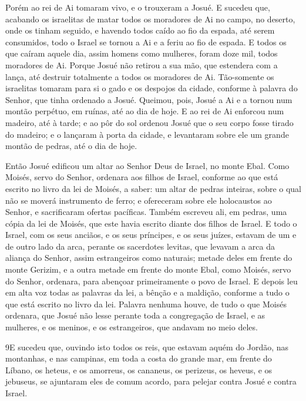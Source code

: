 Porém ao rei de Ai tomaram vivo, e o trouxeram a Josué. E
sucedeu que, acabando os israelitas de matar todos os moradores de
Ai no campo, no deserto, onde os tinham seguido, e havendo todos
caído ao fio da espada, até serem consumidos, todo o Israel se
tornou a Ai e a feriu ao fio de espada. E todos os que caíram
aquele dia, assim homens como mulheres, foram doze mil, todos
moradores de Ai. Porque Josué não retirou a sua mão, que
estendera com a lança, até destruir totalmente a todos os moradores
de Ai. Tão-somente os israelitas tomaram para si o gado e os
despojos da cidade, conforme à palavra do Senhor, que tinha ordenado
a Josué. Queimou, pois, Josué a Ai e a tornou num montão
perpétuo, em ruínas, até ao dia de hoje. E ao rei de Ai
enforcou num madeiro, até à tarde; e ao pôr do sol ordenou Josué que
o seu corpo fosse tirado do madeiro; e o lançaram à porta da cidade,
e levantaram sobre ele um grande montão de pedras, até o dia de
hoje.

Então Josué edificou um altar ao Senhor Deus de Israel, no monte
Ebal. Como Moisés, servo do Senhor, ordenara aos filhos de
Israel, conforme ao que está escrito no livro da lei de Moisés, a
saber: um altar de pedras inteiras, sobre o qual não se moverá
instrumento de ferro; e ofereceram sobre ele holocaustos ao Senhor,
e sacrificaram ofertas pacíficas. Também escreveu ali, em
pedras, uma cópia da lei de Moisés, que este havia escrito diante
dos filhos de Israel. E todo o Israel, com os seus anciãos, e
os seus príncipes, e os seus juízes, estavam de um e de outro lado
da arca, perante os sacerdotes levitas, que levavam a arca da
aliança do Senhor, assim estrangeiros como naturais; metade deles em
frente do monte Gerizim, e a outra metade em frente do monte Ebal,
como Moisés, servo do Senhor, ordenara, para abençoar primeiramente
o povo de Israel. E depois leu em alta voz todas as palavras
da lei, a bênção e a maldição, conforme a tudo o que está escrito no
livro da lei. Palavra nenhuma houve, de tudo o que Moisés
ordenara, que Josué não lesse perante toda a congregação de Israel,
e as mulheres, e os meninos, e os estrangeiros, que andavam no meio
deles.

\medskip

\lettrine{9} E sucedeu que, ouvindo isto todos os reis, que
estavam aquém do Jordão, nas montanhas, e nas campinas, em toda a
costa do grande mar, em frente do Líbano, os heteus, e os amorreus,
os cananeus, os perizeus, os heveus, e os jebuseus, se ajuntaram
eles de comum acordo, para pelejar contra Josué e contra Israel.

